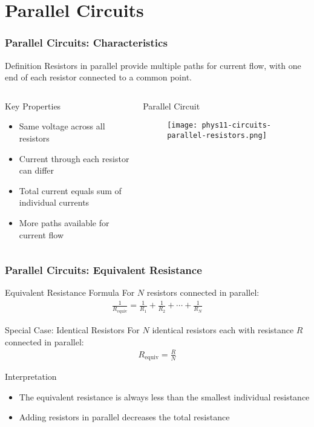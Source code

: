 \documentclass{beamer}
\begin{document}
\section{Parallel Circuits}

\begin{frame}
\frametitle{Parallel Circuits: Characteristics}
\begin{block}{Definition}
Resistors in parallel provide multiple paths for current flow, with one end of each resistor connected to a common point.
\end{block}

\begin{columns}
\begin{block}{Key Properties}
\begin{itemize}
\item Same voltage across all resistors
\item Current through each resistor can differ
\item Total current equals sum of individual currents
\item More paths available for current flow
\end{itemize}
\end{block}

\begin{alertblock}{Parallel Circuit}
\alert{}
\begin{figure}
    \centering
    \texttt{[image: phys11-circuits-parallel-resistors.png]}
\end{figure}
\end{alertblock}
\end{columns}
\end{frame}

\begin{frame}
\frametitle{Parallel Circuits: Equivalent Resistance}
\begin{block}{Equivalent Resistance Formula}
For $N$ resistors connected in parallel:
\begin{align}
\frac{1}{R_{\text{equiv}}} = \frac{1}{R_1} + \frac{1}{R_2} + \cdots + \frac{1}{R_N}
\end{align}
\end{block}

\begin{block}{Special Case: Identical Resistors}
For $N$ identical resistors each with resistance $R$ connected in parallel:
\begin{align}
R_{\text{equiv}} = \frac{R}{N}
\end{align}
\end{block}

\begin{block}{Interpretation}
\begin{itemize}
\item The equivalent resistance is always less than the smallest individual resistance
\item Adding resistors in parallel decreases the total resistance
\end{itemize}
\end{block}
\end{frame}
\end{document}
